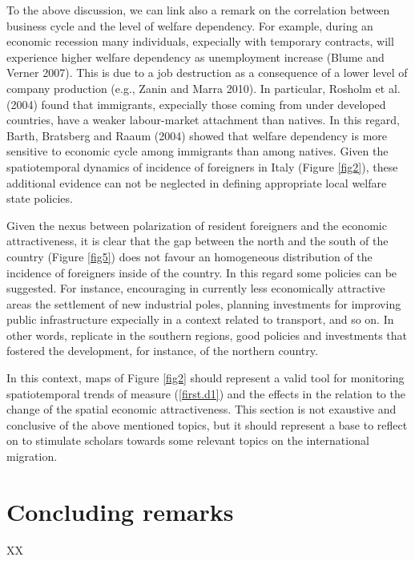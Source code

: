 \documentclass[10pt]{article}
\theoremstyle{definition}
\theoremstyle{plain}
\begin{document}
To the above discussion, we can link also a remark on the correlation between business cycle and the level of welfare dependency. For example, during an economic recession many individuals, expecially with temporary contracts, will experience higher welfare dependency as unemployment increase (Blume and Verner 2007). This is due to a job destruction as a consequence of a lower level of company production (e.g., Zanin and Marra 2010). In particular, Rosholm et al. (2004) found that immigrants, expecially those coming from under developed countries, have a weaker labour-market attachment than natives. In this regard, Barth, Bratsberg and Raaum (2004) showed that welfare dependency is more sensitive to economic cycle among immigrants than among natives. Given the spatiotemporal dynamics of incidence of foreigners in Italy (Figure \ref{fig2}), these additional evidence can not be neglected in defining appropriate local welfare state policies.

Given the nexus between polarization of resident foreigners and the economic attractiveness, it is clear that the gap between the north and the south of the country (Figure \ref{fig5}) does not favour an homogeneous distribution of the incidence of foreigners inside of the country. In this regard some policies can be suggested. For instance, encouraging in currently less economically attractive areas the settlement of new industrial poles, planning investments for improving public infrastructure expecially in a context related to transport, and so on. In other words, replicate in the southern regions, good policies and investments that fostered the development, for instance, of the northern country.

In this context, maps of Figure \ref{fig2} should represent a valid tool for monitoring spatiotemporal trends of measure (\ref{first.d1}) and the effects in the relation to the change of the spatial economic attractiveness. This section is not exaustive and conclusive of the above mentioned topics, but it should represent a base to reflect on to stimulate scholars towards some relevant topics on the international migration.



\section{Concluding remarks \label{CONC}}
XX
\end{document}
